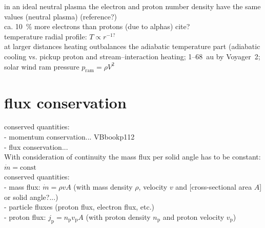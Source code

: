 	in an ideal neutral plasma the electron and proton number density have the same values (neutral plasma) (reference?)\\
	ca. 10~\% more electrons than protons (due to alphas) cite?\\	%
temperature radial profile: $T \propto r^{-1?}$\\
	at larger distances heating outbalances the adiabatic temperature part (adiabatic cooling vs. pickup proton and stream--interaction heating; 1--68~au by Voyager~2; \citet{Richardson2003}\\
solar wind ram pressure $p_\text{ram} = \rho V^2$\\

\section{flux conservation}
conserved quantities:\\
- momentum conservation... VBbookp112\\
- flux conservation...\\



With consideration of continuity the mass flux per solid angle has to be constant: $\dot{m} = \text{const}$\\
conserved quantities:\\
- mass flux: $\dot{m} = \rho v A$ (with mass density $\rho$, velocity $v$ and [cross-sectional area $A$] or solid angle?...)\\
- particle fluxes (proton flux, electron flux, etc.)\\
	- proton flux: $j_\text{p} = n_\text{p} v_\text{p} A$ (with proton density $n_\text{p}$ and proton velocity $v_\text{p}$)\\

